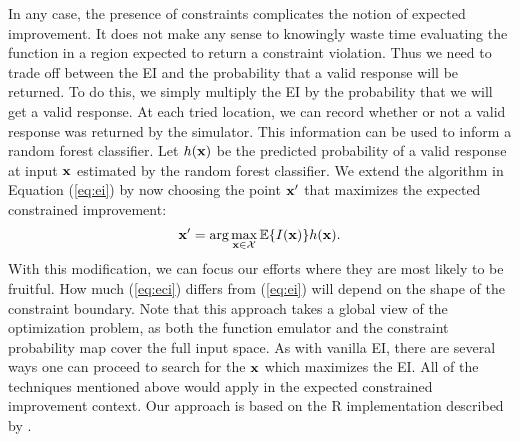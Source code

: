 \documentclass[12pt]{article}
\begin{document}
In any case, the presence of constraints complicates the notion of
expected improvement.  It does not make any sense to knowingly waste
time evaluating the function in a region expected to return a
constraint violation.  Thus we need to trade off between the EI and
the probability that a valid response will be returned.  To do this,
we simply multiply the EI by the probability that we will get a valid
response. At each tried location, we can record whether or not a valid
response was returned by the simulator. This information can be used
to inform a random forest classifier. Let $h({\bf x})$ be the
predicted probability of a valid response at input ${\bf x}$ estimated
by the random forest classifier.  We extend the algorithm in Equation
(\ref{eq:ei}) by now choosing the point ${\bf x'}$ that maximizes the
expected constrained improvement:
\begin{equation}
{\bf x'} = \mbox{arg} \max_{{\bf x}\in \mathcal{X}} \mathbb{E}\{I({\bf
  x})\}h({\bf x}).
\label{eq:eci}
\end{equation}
With this modification, we can focus our efforts where they are most
likely to be fruitful.  How much (\ref{eq:eci}) differs from
(\ref{eq:ei}) will depend on the shape of the constraint boundary.
Note that this approach takes a global view of 
the optimization problem, as both the function emulator and the
constraint probability map cover the full input space.  As with
vanilla EI, there are several ways one can proceed to search for the
${\bf x}$ which maximizes the EI.  All of the techniques mentioned
above would apply in the expected constrained improvement context.
Our approach is based on the {\sf R} implementation described by
\cite{gramacy:taddy:2010}.
\end{document}
